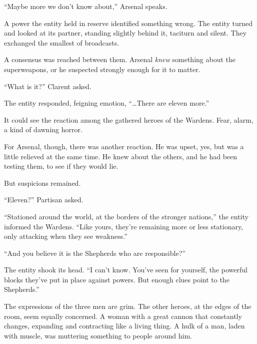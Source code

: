 ``Maybe more we don't know about,'' Arsenal speaks.



A power the entity held in reserve identified something wrong.  The entity turned and looked at its partner, standing slightly behind it, taciturn and silent.  They exchanged the smallest of broadcasts.



A consensus was reached between them.  Arsenal \emph{knew }something about the superweapons, or he suspected strongly enough for it to matter.



``What is it?'' Clarent asked.



The entity responded, feigning emotion, ``\ldots{}There are eleven more.''



It could see the reaction among the gathered heroes of the Wardens.  Fear, alarm, a kind of dawning horror.



For Arsenal, though, there was another reaction.  He was upset, yes, but was a little relieved at the same time.  He knew about the others, and he had been testing them, to see if they would lie.



But suspicions remained.



``Eleven?''  Partisan asked.



``Stationed around the world, at the borders of the stronger nations,'' the entity informed the Wardens.  ``Like yours, they're remaining more or less stationary, only attacking when they see weakness.''



``And you believe it is the Shepherds who are responsible?''



The entity shook its head.  ``I can't know.  You've seen for yourself, the powerful blocks they've put in place against powers.  But enough clues point to the Shepherds.''



The expressions of the three men are grim.  The other heroes, at the edges of the room, seem equally concerned.  A woman with a great cannon that constantly changes, expanding and contracting like a living thing.  A hulk of a man, laden with muscle, was muttering something to people around him.



